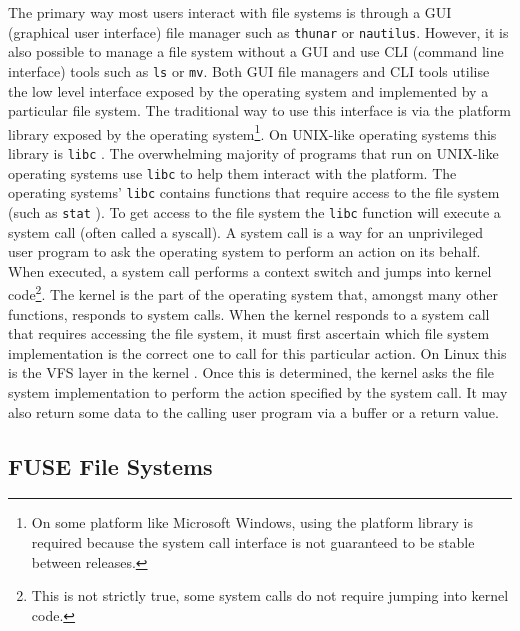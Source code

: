 The primary way most users interact with file systems is through a GUI
(graphical user interface) file manager such as \texttt{thunar} or
\texttt{nautilus}. 
However, it is also possible to manage a file system without a GUI and use CLI
(command line interface) tools such as \texttt{ls} or \texttt{mv}. Both GUI
file managers and CLI tools utilise the low level interface exposed by the
operating system and implemented by a particular file system. The traditional
way to use this interface is via the platform library exposed by the operating
system\footnote{On some platform like Microsoft Windows, using the platform
library is required because the system call interface is not guaranteed to be
stable between releases.}.  On
UNIX-like operating systems this library is \texttt{libc} \cite{libc}.  The overwhelming majority of programs that run on UNIX-like
operating systems use \texttt{libc} to help them interact with the platform.
The operating systems' \texttt{libc} contains functions that require access to
the file system (such as \texttt{stat} \cite{stat-syscall}). To get access to
the file system the \texttt{libc} function will execute a system
call \cite{syscalls} (often called a syscall). A system call is a way for an
unprivileged user program to ask the operating system to perform an action on
its behalf. When executed, a system call performs a context switch
 and jumps into kernel
code\footnote{This is not strictly true, some system calls do not require
jumping into kernel code.}. The kernel is the part of the operating system
that, amongst many other functions, responds to system calls. When the kernel
responds to a system call that requires accessing the file system, it must
first ascertain which file system implementation is the correct one to call for
this particular action. On Linux this is the VFS layer in the kernel
\cite{kernel-vfs}. Once this is determined, the kernel asks the file system
implementation to perform the action specified by the system call. It may also
return some data to the calling user program via a buffer or a return value.

\subsection{FUSE File Systems}

